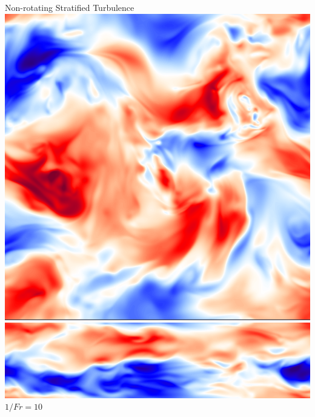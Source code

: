 \documentclass[aspecttatio=169]{beamer}
\begin{document}
\begin{frame}{Non-rotating Stratified Turbulence}
        \includegraphics[width=\textwidth]{images/XYB10ux.png}
        \includegraphics[width=\textwidth]{images/XZB10ux.png}
    \emp
    \hspace{1pt}
        \centering
        $1/Fr = 10$
        \vspace{2pt}
        

\end{frame}
\end{document}
